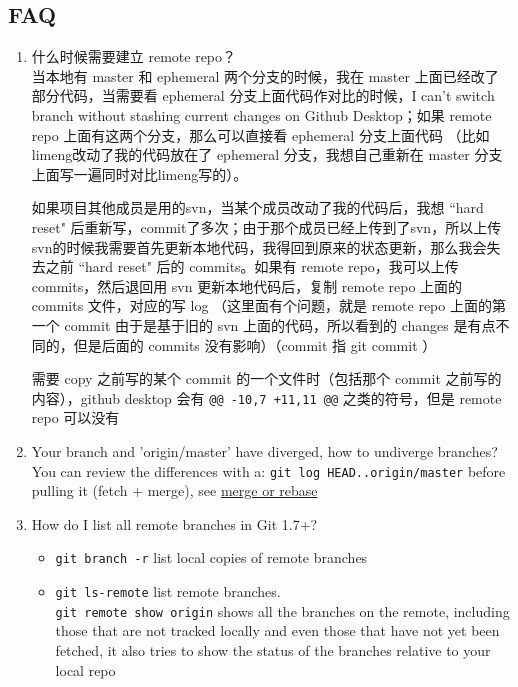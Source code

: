 \documentclass[a4paper, 12pt]{article}
\begin{document}
\subsection{FAQ}
\begin{enumerate}
\item 什么时候需要建立 remote repo？\\
当本地有 master 和 ephemeral 两个分支的时候，我在 master 上面已经改了部分代码，当需要看 ephemeral 分支上面代码作对比的时候，I can't switch branch without stashing current changes on Github Desktop；如果 remote repo 上面有这两个分支，那么可以直接看 ephemeral 分支上面代码 （比如limeng改动了我的代码放在了 ephemeral 分支，我想自己重新在 master 分支上面写一遍同时对比limeng写的）。

如果项目其他成员是用的svn，当某个成员改动了我的代码后，我想 ``hard reset" 后重新写，commit了多次；由于那个成员已经上传到了svn，所以上传svn的时候我需要首先更新本地代码，我得回到原来的状态更新，那么我会失去之前 ``hard reset" 后的 commits。如果有 remote repo，我可以上传 commits，然后退回用 svn 更新本地代码后，复制 remote repo 上面的 commits 文件，对应的写 log （这里面有个问题，就是 remote repo 上面的第一个 commit 由于是基于旧的 svn 上面的代码，所以看到的 changes 是有点不同的，但是后面的 commits 没有影响）（{\color{red}commit 指 git commit }）

需要 copy 之前写的某个 commit 的一个文件时（包括那个 commit 之前写的内容），github desktop 会有 \verb|@@ -10,7 +11,11 @@| 之类的符号，但是 remote repo 可以没有

\item Your branch and 'origin/master' have diverged, how to undiverge branches?\\
You can review the differences with a: \verb|git log HEAD..origin/master| before pulling it (fetch + merge), see \href{https://stackoverflow.com/questions/2452226/master-branch-and-origin-master-have-diverged-how-to-undiverge-branches}{merge or rebase}

\item How do I list all remote branches in Git 1.7+?
\begin{itemize}
\item \verb|git branch -r| list local copies of remote branches

\item \verb|git ls-remote| list remote branches.\\ \verb|git remote show origin| shows all the branches on the remote, including those that are not tracked locally and even those that have not yet been fetched, it also tries to show the status of the branches relative to your local repo


\end{itemize}
\end{enumerate}
\end{document}
